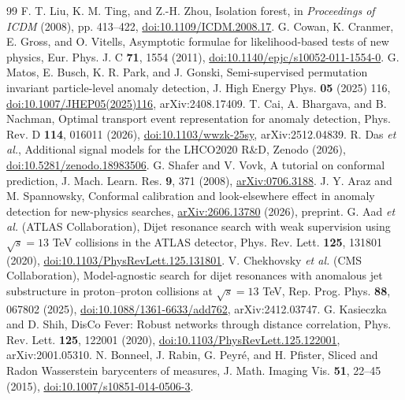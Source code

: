 \documentclass[reprint,aps,pra,amsmath,amssymb,floatfix,raggedbottom]{revtex4-2}
\begin{document}
\begin{thebibliography}{99}
 F. T. Liu, K. M. Ting, and Z.-H. Zhou, Isolation forest, in \textit{Proceedings of ICDM} (2008), pp. 413--422, \href{https://doi.org/10.1109/ICDM.2008.17}{doi:10.1109/ICDM.2008.17}.
 G. Cowan, K. Cranmer, E. Gross, and O. Vitells, Asymptotic formulae for likelihood-based tests of new physics, Eur. Phys. J. C \textbf{71}, 1554 (2011), \href{https://doi.org/10.1140/epjc/s10052-011-1554-0}{doi:10.1140/epjc/s10052-011-1554-0}.
 G. Matos, E. Busch, K. R. Park, and J. Gonski, Semi-supervised permutation invariant particle-level anomaly detection, J. High Energy Phys. \textbf{05} (2025) 116, \href{https://doi.org/10.1007/JHEP05(2025)116}{doi:10.1007/JHEP05(2025)116}, arXiv:2408.17409.
 T. Cai, A. Bhargava, and B. Nachman, Optimal transport event representation for anomaly detection, Phys. Rev. D \textbf{114}, 016011 (2026), \href{https://doi.org/10.1103/wwzk-25sy}{doi:10.1103/wwzk-25sy}, arXiv:2512.04839.
 R. Das \textit{et al.}, Additional signal models for the LHCO2020 R\&D, Zenodo (2026), \href{https://doi.org/10.5281/zenodo.18983506}{doi:10.5281/zenodo.18983506}.
 G. Shafer and V. Vovk, A tutorial on conformal prediction, J. Mach. Learn. Res. \textbf{9}, 371 (2008), \href{https://arxiv.org/abs/0706.3188}{arXiv:0706.3188}.
 J. Y. Araz and M. Spannowsky, Conformal calibration and look-elsewhere effect in anomaly detection for new-physics searches, \href{https://arxiv.org/abs/2606.13780}{arXiv:2606.13780} (2026), preprint.
 G. Aad \textit{et al.} (ATLAS Collaboration), Dijet resonance search with weak supervision using $\sqrt{s}=13$ TeV collisions in the ATLAS detector, Phys. Rev. Lett. \textbf{125}, 131801 (2020), \href{https://doi.org/10.1103/PhysRevLett.125.131801}{doi:10.1103/PhysRevLett.125.131801}.
 V. Chekhovsky \textit{et al.} (CMS Collaboration), Model-agnostic search for dijet resonances with anomalous jet substructure in proton--proton collisions at $\sqrt{s}=13$ TeV, Rep. Prog. Phys. \textbf{88}, 067802 (2025), \href{https://doi.org/10.1088/1361-6633/add762}{doi:10.1088/1361-6633/add762}, arXiv:2412.03747.
 G. Kasieczka and D. Shih, DisCo Fever: Robust networks through distance correlation, Phys. Rev. Lett. \textbf{125}, 122001 (2020), \href{https://doi.org/10.1103/PhysRevLett.125.122001}{doi:10.1103/PhysRevLett.125.122001}, arXiv:2001.05310.
 N. Bonneel, J. Rabin, G. Peyr\'e, and H. Pfister, Sliced and Radon Wasserstein barycenters of measures, J. Math. Imaging Vis. \textbf{51}, 22--45 (2015), \href{https://doi.org/10.1007/s10851-014-0506-3}{doi:10.1007/s10851-014-0506-3}.
\end{thebibliography}
\end{document}
